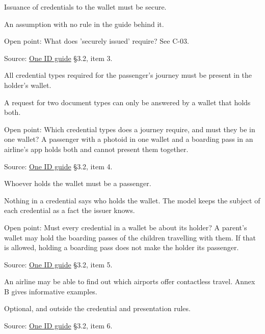 \begin{definition}
  \label{def:c17}
  \notready
  Issuance of credentials to the wallet must be secure.

  An assumption with no rule in the guide behind it.

  Open point: What does 'securely issued' require? See C-03.

  Source:
  \href{https://standards.atlassian.net/wiki/spaces/OneID/pages/2947416082/Technical+Implementation+Guide}{One
  ID guide} §3.2, item 3.
\end{definition}

\begin{definition}
  \label{def:c18}
  \notready
  All credential types required for the passenger's journey must be present
  in the holder's wallet.

  A request for two document types can only be answered by a wallet that
  holds both.

  Open point: Which credential types does a journey require, and must they be
  in one wallet? A passenger with a photoid in one wallet and a boarding pass
  in an airline's app holds both and cannot present them together.

  Source:
  \href{https://standards.atlassian.net/wiki/spaces/OneID/pages/2947416082/Technical+Implementation+Guide}{One
  ID guide} §3.2, item 4.
\end{definition}

\begin{definition}
  \label{def:c19}
  \notready
  Whoever holds the wallet must be a passenger.

  Nothing in a credential says who holds the wallet. The model keeps the
  subject of each credential as a fact the issuer knows.

  Open point: Must every credential in a wallet be about its holder? A
  parent's wallet may hold the boarding passes of the children travelling
  with them. If that is allowed, holding a boarding pass does not make the
  holder its passenger.

  Source:
  \href{https://standards.atlassian.net/wiki/spaces/OneID/pages/2947416082/Technical+Implementation+Guide}{One
  ID guide} §3.2, item 5.
\end{definition}

\begin{definition}
  \label{def:c20}
  An airline may be able to find out which airports offer contactless travel.
  Annex B gives informative examples.

  Optional, and outside the credential and presentation rules.

  Source:
  \href{https://standards.atlassian.net/wiki/spaces/OneID/pages/2947416082/Technical+Implementation+Guide}{One
  ID guide} §3.2, item 6.
\end{definition}

